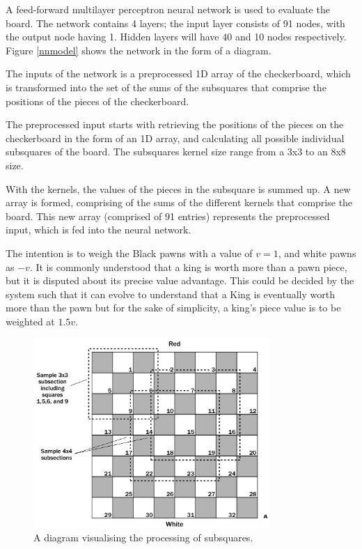 \documentclass[12pt,a4paper]{article}
\begin{document}
        A feed-forward multilayer perceptron neural network is used to evaluate the board. The network contains 4 layers; the input layer consists of 91 nodes, with the output node having 1. Hidden layers will have 40 and 10 nodes respectively. Figure \ref{nnmodel} shows the network in the form of a diagram.

        The inputs of the network is a preprocessed 1D array of the checkerboard, which is transformed into the set of the sums of the subsquares that comprise the positions of the pieces of the checkerboard.
    
        The preprocessed input starts with retrieving the positions of the pieces on the checkerboard in the form of an 1D array, and calculating  all possible individual subsquares of the board. The subsquares kernel size range from a 3x3 to an 8x8 size. 

        With the kernels, the values of the pieces in the subsquare is summed up. A new array is formed, comprising of the sums of the different kernels that comprise the board. This new array (comprised of 91 entries) represents the preprocessed input, which is fed into the neural network.

        The intention is to weigh the Black pawns with a value of $v=1$, and white pawns as $-v$. It is commonly understood that a king is worth more than a pawn piece, but it is disputed about its precise value advantage. This could be decided by the system such that it can evolve to understand that a King is eventually worth more than the pawn but for the sake of simplicity, a king's piece value is to be weighted at $1.5v$.

        \begin{figure}[!h]
            \centering
            \includegraphics[width=90mm]{images/subsquares.png}
            \caption{A diagram visualising the processing of subsquares.\label{subsquares}}
        \end{figure}
\end{document}
